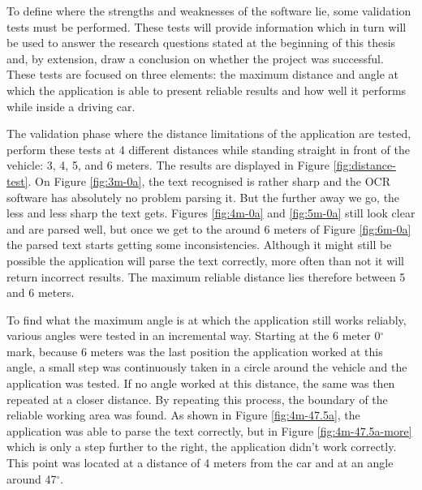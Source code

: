 To define where the strengths and weaknesses of the software lie, some validation tests must be performed. These tests will provide information which in turn will be used to answer the research questions stated at the beginning of this thesis and, by extension, draw a conclusion on whether the project was successful. These tests are focused on three elements: the maximum distance and angle at which the application is able to present reliable results and how well it performs while inside a driving car.


The validation phase where the distance limitations of the application are tested, perform these tests at 4 different distances while standing straight in front of the vehicle: 3, 4, 5, and 6 meters. The results are displayed in Figure \ref{fig:distance-test}. On Figure \ref{fig:3m-0a}, the text recognised is rather sharp and the OCR software has absolutely no problem parsing it. But the further away we go, the less and less sharp the text gets. Figures \ref{fig:4m-0a} and \ref{fig:5m-0a} still look clear and are parsed well, but once we get to the around 6 meters of Figure \ref{fig:6m-0a} the parsed text starts getting some inconsistencies. Although it might still be possible the application will parse the text correctly, more often than not it will return incorrect results. The maximum reliable distance lies therefore between 5 and 6 meters. %


To find what the maximum angle is at which the application still works reliably, various angles were tested in an incremental way. Starting at the 6 meter 0$^{\circ}$ mark, because 6 meters was the last position the application worked at this angle, a small step was continuously taken in a circle around the vehicle and the application was tested. If no angle worked at this distance, the same was then repeated at a closer distance. By repeating this process, the boundary of the reliable working area was found. As shown in Figure \ref{fig:4m-47.5a}, the application was able to parse the text correctly, but in Figure \ref{fig:4m-47.5a-more} which is only a step further to the right, the application didn't work correctly. This point was located at a distance of 4 meters from the car and at an angle around 47$^{\circ}$.

\clearpage


